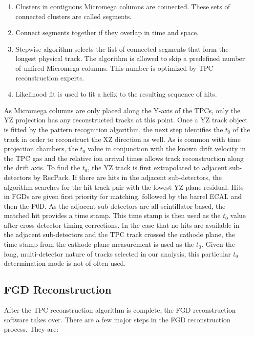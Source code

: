 \begin{enumerate}
\item Clusters in contiguous Micromega columns are connected. These sets of connected clusters are called segments.
\item Connect segments together if they overlap in time and space.
\item Stepwise algorithm selects the list of connected segments that form the longest physical track. The algorithm is allowed to skip a predefined number of unfired Micromega columns. This number is optimized by TPC reconstruction experts.
\item Likelihood fit is used to fit a helix to the resulting sequence of hits.
\end{enumerate}

As Micromega columns are only placed along the Y-axis of the TPCs, only the YZ projection has any reconstructed tracks at this point. Once a YZ track object is fitted by the pattern recognition algorithm, the next step identifies the $t_0$ of the track in order to reconstruct the XZ direction as well. As is common with time projection chambers, the $t_0$ value in conjunction with the known drift velocity in the TPC gas and the relative ion arrival times allows track reconstruction along the drift axis. To find the $t_0$, the YZ track is first extrapolated to adjacent sub-detectors by RecPack. If there are hits in the adjacent sub-detectors, the algorithm searches for the hit-track pair with the lowest YZ plane residual. Hits in FGDs are given first priority for matching, followed by the barrel ECAL and then the P0D. As the adjacent sub-detectors are all scintillator based, the matched hit provides a time stamp. This time stamp is then used as the $t_0$ value after cross detector timing corrections. In the case that no hits are available in the adjacent sub-detectors and the TPC track crossed the cathode plane, the time stamp from the cathode plane measurement is used as the $t_0$. Given the long, multi-detector nature of tracks selected in our analysis, this particular $t_0$ determination mode is not of often used.

\subsection{FGD Reconstruction}
\label{sec:fgdrecon}

After the TPC reconstruction algorithm is complete, the FGD reconstruction software takes over. There are a few major steps in the FGD reconstruction process. They are:

